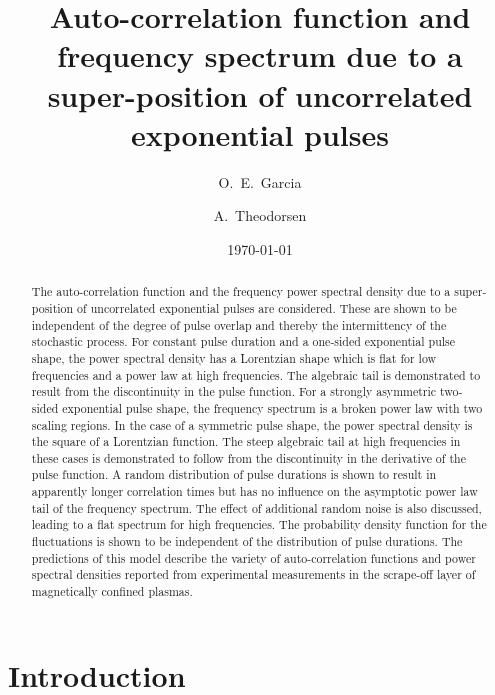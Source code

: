 \documentclass[aps,prb,12pt,a4paper,preprint,amsmath,amssymb,groupedaddress]{revtex4-1}
\begin{document}
\title{Auto-correlation function and frequency spectrum due to a super-position of uncorrelated exponential pulses}

\author{O.~E.~Garcia}
\author{A.~Theodorsen}


\date{\today}



\begin{abstract}
The auto-correlation function and the frequency power spectral density due to a super-position of uncorrelated exponential pulses are considered. These are shown to be independent of the degree of pulse overlap and thereby the intermittency of the stochastic process. For constant pulse duration and a one-sided exponential pulse shape, the power spectral density has a Lorentzian shape which is flat for low frequencies and a power law  at high frequencies. The algebraic tail is demonstrated to result from the discontinuity in the pulse function. For a strongly asymmetric two-sided exponential pulse shape, the frequency spectrum is a broken power law with two scaling regions. In the case of a symmetric pulse shape, the power spectral density is the square of a Lorentzian function. The steep algebraic tail at high frequencies in these cases is demonstrated to follow from the discontinuity in the derivative of the pulse function. A random distribution of pulse durations is shown to result in apparently longer correlation times but has no influence on the asymptotic power law tail of the frequency spectrum. The effect of additional random noise is also discussed, leading to a flat spectrum for high frequencies. The probability density function for the fluctuations is shown to be independent of the distribution of pulse durations. The predictions of this model describe the variety of auto-correlation functions and power spectral densities reported from experimental measurements in the scrape-off layer of magnetically confined plasmas.
\end{abstract}



\maketitle



\section{Introduction}
\end{document}
